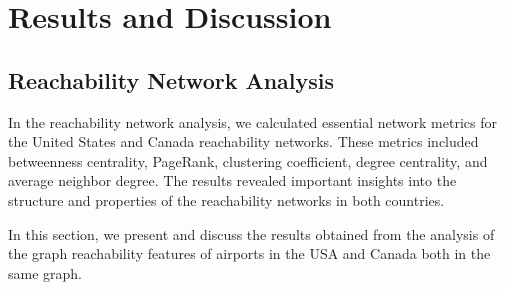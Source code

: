 \section{Results and Discussion}

\subsection{Reachability Network Analysis}

In the reachability network analysis, we calculated essential network metrics for the United States and Canada reachability networks. These metrics included betweenness centrality, PageRank, clustering coefficient, degree centrality, and average neighbor degree. The results revealed important insights into the structure and properties of the reachability networks in both countries.


In this section, we present and discuss the results obtained from the analysis of the graph reachability features of airports in the USA and Canada both in the same graph.

